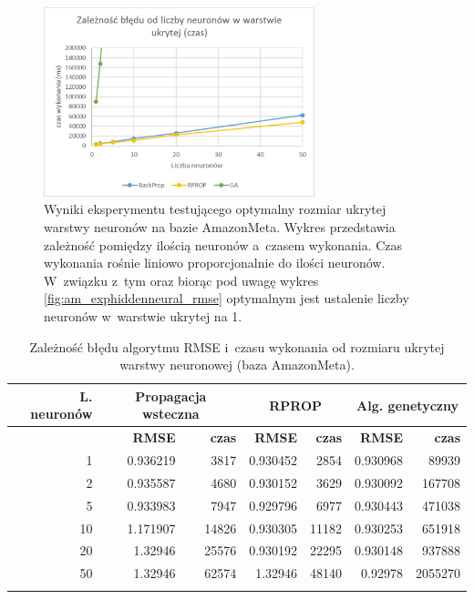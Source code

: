 \documentclass[twoside]{iisthesis}
\begin{document}
				\begin{figure}
					\centering
					\includegraphics[width=0.7\textwidth]{am_exphiddenneural_time}
					\caption{Wyniki eksperymentu testującego optymalny rozmiar ukrytej warstwy neuronów na bazie AmazonMeta. Wykres przedstawia zależność pomiędzy ilością neuronów a~czasem wykonania. Czas wykonania rośnie liniowo proporcjonalnie do ilości neuronów. W~związku z~tym oraz biorąc pod uwagę wykres \ref{fig:am_exphiddenneural_rmse} optymalnym jest ustalenie liczby neuronów w~warstwie ukrytej na 1.}
					\label{fig:am_exphiddenneural_time}
				\end{figure}
	
				\begin{longtable}{r||rr|rr|rr}
					\label{tab:am_exphiddenneural}
					\centering
					\textbf{L. neuronów} &  \multicolumn{2}{c|}{\textbf{Propagacja wsteczna}}  & \multicolumn{2}{c|}{\textbf{RPROP}} & \multicolumn{2}{c}{\textbf{Alg. genetyczny}}  \\
					\hline
					& \textbf{RMSE} & \textbf{czas} & \textbf{RMSE} & \textbf{czas} & \textbf{RMSE} & \textbf{czas} \\
					\hline
					1  & 0.936219 & 3817  & 0.930452 & 2854  & 0.930968 & 89939   \\
					2  & 0.935587 & 4680  & 0.930152 & 3629  & 0.930092 & 167708  \\
					5  & 0.933983 & 7947  & 0.929796 & 6977  & 0.930443 & 471038  \\
					10 & 1.171907 & 14826 & 0.930305 & 11182 & 0.930253 & 651918  \\
					20 & 1.32946  & 25576 & 0.930192 & 22295 & 0.930148 & 937888  \\
					50 & 1.32946  & 62574 & 1.32946  & 48140 & 0.92978  & 2055270 \\	
					\caption{Zależność błędu algorytmu RMSE i~czasu wykonania od rozmiaru ukrytej warstwy neuronowej (baza AmazonMeta).}
				\end{longtable}
			
\end{document}
